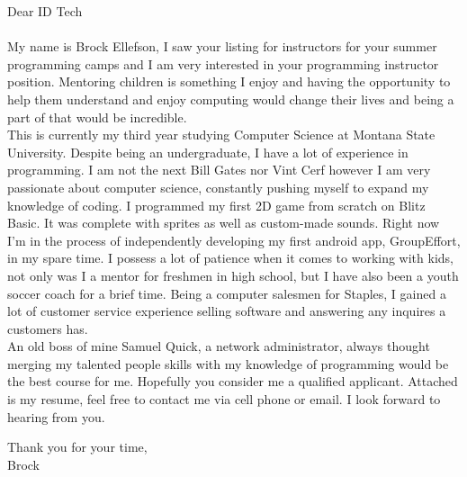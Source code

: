 \documentclass[a4paper,12pt]{letter}
\author{Brock Ellefson} %
\begin{document}
Dear ID Tech\\\\
My name is Brock Ellefson, I saw your listing for instructors for your summer programming camps and I am very interested in your  programming instructor position. Mentoring children is something I enjoy and having the opportunity to help them understand and enjoy computing would change their lives and being a part of that would be incredible. \\ 


This is currently my third year studying Computer Science at Montana State University. Despite being an undergraduate, I have a lot of experience in programming. I am not the next Bill Gates nor Vint Cerf however I am very passionate about computer science, constantly pushing myself to expand my knowledge of coding. I programmed my first 2D game from scratch on Blitz Basic. It was complete with sprites as well as custom-made sounds. Right now I'm in the process of independently developing my first android app, GroupEffort, in my spare time. I possess a lot of patience when it comes to working with kids, not only was I a mentor for freshmen in high school, but I have also been a youth soccer coach for a brief time. Being a computer salesmen for Staples, I gained a lot of customer service experience selling software and answering any inquires a customers has.\\   

An old boss of mine Samuel Quick, a network administrator, always thought merging my talented people skills with my knowledge of programming would be the best course for me. Hopefully you consider me a qualified applicant. Attached is my resume, feel free to contact me via cell phone or email. I look forward to hearing from you.

Thank you for your time, \\
Brock
\end{document}
